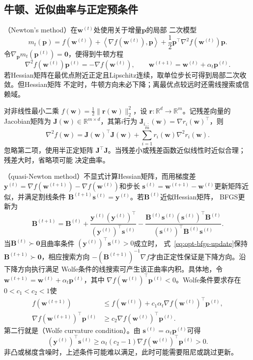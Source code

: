 \subsection{牛顿、近似曲率与正定预条件}

（Newton's method）在$\bm{w}^{(t)}$处使用关于增量$\bm{p}$的局部
二次模型
\[
  m_t(\bm{p})
  =
  f(\bm{w}^{(t)})
  +\left\langle\nabla f(\bm{w}^{(t)}),\bm{p}\right\rangle
  +\frac12\bm{p}^{\top}\nabla^2f(\bm{w}^{(t)})\bm{p}.
\]
令$\nabla_{\bm{p}}m_t(\bm{p}^{(t)})=\bm{0}$，便得到牛顿方程
\[
  \nabla^2 f(\bm{w}^{(t)})\bm{p}^{(t)}
  =-\nabla f(\bm{w}^{(t)}),\qquad
  \bm{w}^{(t+1)}=\bm{w}^{(t)}+\alpha_t\bm{p}^{(t)}.
\]
若Hessian矩阵在最优点附近正定且Lipschitz连续，取单位步长可得到局部二次收敛。但Hessian矩阵
不定时，牛顿方向未必下降；离最优点较远时还需线搜索或信赖域。

对非线性最小二乘
$f(\bm{w})=\frac12\lVert\bm{r}(\bm{w})\rVert_2^2$，设
$\bm{r}:\mathbb{R}^d\to\mathbb{R}^m$。记残差向量的Jacobian矩阵为
$\bm{J}(\bm{w})\in\mathbb{R}^{m\times d}$，其第$i$行为
$\bm{J}_{i,:}(\bm{w})=\nabla r_i(\bm{w})^{\top}$，则
\[
  \nabla^2f(\bm{w})
  =\bm{J}(\bm{w})^{\top}\bm{J}(\bm{w})
  +\sum_{i=1}^m r_i(\bm{w})\nabla^2r_i(\bm{w}).
\]
忽略第二项，使用半正定矩阵
$\bm{J}^{\top}\bm{J}$。当残差小或残差函数近似线性时近似合理；残差大时，省略项可能
决定曲率。

（quasi-Newton method）不显式计算Hessian矩阵，而用梯度差
$\bm{y}^{(t)}=\nabla f(\bm{w}^{(t+1)})-\nabla f(\bm{w}^{(t)})$和步长
$\bm{s}^{(t)}=\bm{w}^{(t+1)}-\bm{w}^{(t)}$更新矩阵近似，并满足割线条件
$\bm{B}^{(t+1)}\bm{s}^{(t)}=\bm{y}^{(t)}$。若$\bm{B}^{(t)}$近似Hessian矩阵，
BFGS更新为
\begin{equation}
  \bm{B}^{(t+1)}
  =
  \bm{B}^{(t)}
  +
  \frac{\bm{y}^{(t)}(\bm{y}^{(t)})^{\top}}
       {(\bm{y}^{(t)})^{\top}\bm{s}^{(t)}}
  -
  \frac{\bm{B}^{(t)}\bm{s}^{(t)}(\bm{s}^{(t)})^{\top}\bm{B}^{(t)}}
       {(\bm{s}^{(t)})^{\top}\bm{B}^{(t)}\bm{s}^{(t)}}.
  \label{eq:opt-bfgs-update}
\end{equation}
当$\bm{B}^{(t)}\succ\bm{0}$且曲率条件
$(\bm{y}^{(t)})^{\top}\bm{s}^{(t)}>0$成立时，
式~\eqref{eq:opt-bfgs-update}保持$\bm{B}^{(t+1)}\succ\bm{0}$，相应搜索方向
$-(\bm{B}^{(t+1)})^{-1}\nabla f$才由正定性保证是下降方向。沿下降方向执行满足
Wolfe条件的线搜索可产生该正曲率内积。具体地，令
$\bm{w}^{(t+1)}=\bm{w}^{(t)}+\alpha_t\bm{p}^{(t)}$，其中
$\nabla f(\bm{w}^{(t)})^{\top}\bm{p}^{(t)}<0$。Wolfe条件要求存在
$0<c_1<c_2<1$使
\begin{equation}
\begin{aligned}
  f(\bm{w}^{(t+1)})
  &\leq
  f(\bm{w}^{(t)})
  +
  c_1\alpha_t
  \nabla f(\bm{w}^{(t)})^{\top}\bm{p}^{(t)},\\
  \nabla f(\bm{w}^{(t+1)})^{\top}\bm{p}^{(t)}
  &\geq
  c_2\nabla f(\bm{w}^{(t)})^{\top}\bm{p}^{(t)}.
\end{aligned}
\label{eq:opt-wolfe-conditions}
\end{equation}
第二行就是（Wolfe curvature condition）。由
$\bm{s}^{(t)}=\alpha_t\bm{p}^{(t)}$可得
\[
  (\bm{y}^{(t)})^{\top}\bm{s}^{(t)}
  \geq
  \alpha_t(c_2-1)
  \nabla f(\bm{w}^{(t)})^{\top}\bm{p}^{(t)}
  >0.
\]
非凸或梯度含噪时，上述条件可能难以满足，此时可能需要阻尼或跳过更新。

